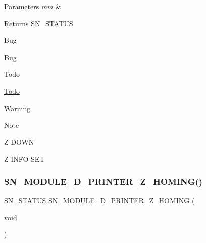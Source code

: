 \begin{DoxyParams}{Parameters}
{\em mm} & \\
\hline
\end{DoxyParams}
\begin{DoxyReturn}{Returns}
S\+N\+\_\+\+S\+T\+A\+T\+US 
\end{DoxyReturn}
\begin{DoxyRefDesc}{Bug}
\item[\hyperlink{bug__bug000011}{Bug}]\end{DoxyRefDesc}
\begin{DoxyRefDesc}{Todo}
\item[\hyperlink{todo__todo000011}{Todo}]\end{DoxyRefDesc}
\begin{DoxyWarning}{Warning}

\end{DoxyWarning}
\begin{DoxyNote}{Note}

\end{DoxyNote}
Z D\+O\+WN

Z I\+N\+FO S\+ET \mbox{\label{group__D_gafa7b9a2a41989695e1b881b984794432}} 
\subsubsection{\texorpdfstring{S\+N\+\_\+\+M\+O\+D\+U\+L\+E\+\_\+D\+\_\+\+P\+R\+I\+N\+T\+E\+R\+\_\+\+Z\+\_\+\+H\+O\+M\+I\+N\+G()}{SN\_MODULE\_3D\_PRINTER\_Z\_HOMING()}}
{\footnotesize\ttfamily S\+N\+\_\+\+S\+T\+A\+T\+US S\+N\+\_\+\+M\+O\+D\+U\+L\+E\+\_\+D\+\_\+\+P\+R\+I\+N\+T\+E\+R\+\_\+\+Z\+\_\+\+H\+O\+M\+I\+NG (\begin{DoxyParamCaption}\item[{void}]{ }\end{DoxyParamCaption})}


